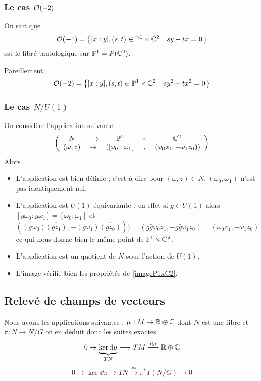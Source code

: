\documentclass[a4paper,10pt]{article}
\begin{document}
\subsubsection{Le cas $\mathcal{O}(-2)$}
On sait que
\[
\mathcal{O}(-1) = \left\lbrace {[x:y],(s,t) \in \mathbb{P}^1 \times \mathbb{C}^2} \; \left| \; { sy - tx = 0 } \right. \right\rbrace
\]
est le fibré tautologique sur $\mathbb{P}^1 = P(\mathbb{C}^2)$.

Pareillement, 
\begin{equation}\label{imageP1xC2}
\mathcal{O}(-2) = \left\lbrace {[x:y],(s,t) \in \mathbb{P}^1 \times \mathbb{C}^2} \; \left| \; { sy^2 - tx^2 = 0 } \right. \right\rbrace
\end{equation}

\subsubsection{Le cas $N/U(1)$}
On considère l'application suivante
\[
\left(
\begin{array}{ccccc}
N & \longrightarrow & \mathbb{P}^1 &\times& \mathbb{C}^2\\
(\omega,z) & \mapsto & \left([\omega_0:\omega_1]\right. &,& \left. (\omega_0\bar{z_1},-\omega_1 \bar{z_0})\right)
\end{array}
\right)
\]
Alors
\begin{itemize}
\item L'application est bien définie ; c'est-à-dire pour $(\omega,z) \in N$, $(\omega_0,\omega_1)$ n'est pas identiquement nul.
\item L'application est $U(1)$-équivariante ; en effet si $g \in U(1)$ alors $[g\omega_0:g\omega_1]=[\omega_0:\omega_1]$ et $((g\omega_0)\overline{(gz_1)},-(g\omega_1) \overline{(gz_0)})) = (g\bar{g}\omega_0\bar{z_1},-g\bar{g}\omega_1 \bar{z_0})=(\omega_0\bar{z_1},-\omega_1 \bar{z_0})$ ce qui nous donne bien le même point de $\mathbb{P}^1 \times \mathbb{C}^2$.
\item L'application est un quotient de $N$ sous l'action de $U(1)$.
\item L'image vérifie bien les propriétés de \eqref{imageP1xC2}.
\end{itemize}




\subsection{Relevé de champs de vecteurs}
Nous avons les applications suivantes : $\mu : M \rightarrow \mathbb{R} \oplus \mathbb{C}$ dont $N$ est une fibre et $\pi : N \rightarrow N/G$ on en déduit donc les suites exactes
\[
0 \rightarrow \underset{TN}{\underbrace{\ker \operatorname{d\!} \mu}} \longrightarrow TM \overset{\operatorname{d\!} \mu}{\longrightarrow} \mathbb{R} \oplus \mathbb{C}
\]
\[
0 \rightarrow \ker \dd \pi \longrightarrow TN \overset{\dd \pi}{\longrightarrow} \pi^* T\left( N/G\right) \rightarrow 0
\]
\end{document}
